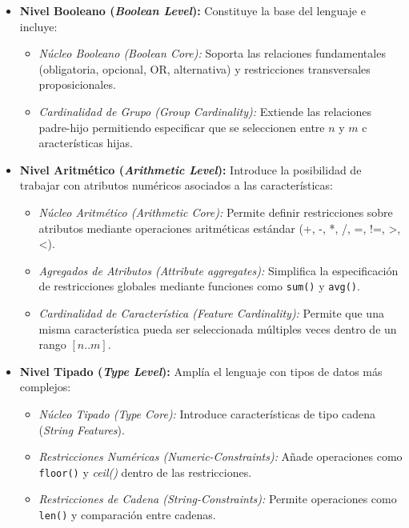 \begin{itemize}
    \item \textbf{Nivel Booleano (\textit{Boolean Level}):} Constituye la base del lenguaje e incluye:
    \begin{itemize}
        \item \textit{Núcleo Booleano (\textit{Boolean Core}):} Soporta las relaciones fundamentales 
        (obligatoria, opcional, OR, alternativa) y restricciones transversales proposicionales.
        \item \textit{Cardinalidad de Grupo (\textit{Group Cardinality}):} Extiende las 
        relaciones padre-hijo permitiendo especificar que se seleccionen entre $n$ y $m$ c
        aracterísticas hijas.
    \end{itemize}
    
    \item \textbf{Nivel Aritmético (\textit{Arithmetic Level}):} Introduce la posibilidad de 
    trabajar con atributos numéricos asociados a las características:
    \begin{itemize}
        \item \textit{Núcleo Aritmético (\textit{Arithmetic Core}):} Permite definir restricciones 
        sobre atributos mediante operaciones aritméticas estándar (+, -, *, /, =, !=, >, <).
        \item \textit{Agregados de Atributos (\textit{Attribute aggregates}):} Simplifica la 
        especificación de restricciones globales mediante funciones como \texttt{sum()} y \texttt{avg()}.
        \item \textit{Cardinalidad de Característica (\textit{Feature Cardinality}):} 
        Permite que una misma característica pueda ser seleccionada múltiples veces dentro de 
        un rango $[n..m]$.
    \end{itemize}
    
    \item \textbf{Nivel Tipado (\textit{Type Level}):} Amplía el lenguaje con tipos de datos 
    más complejos:
    \begin{itemize}
        \item \textit{Núcleo Tipado (\textit{Type Core}):} Introduce características de 
        tipo cadena (\textit{String Features}).
        \item \textit{Restricciones Numéricas (\textit{Numeric-Constraints}):} Añade operaciones 
        como \texttt{floor()} y \textit{ceil()} dentro de las restricciones.
        \item \textit{Restricciones de Cadena (\textit{String-Constraints}):} Permite operaciones 
        como \texttt{len()} y comparación entre cadenas.
    \end{itemize}
\end{itemize}

